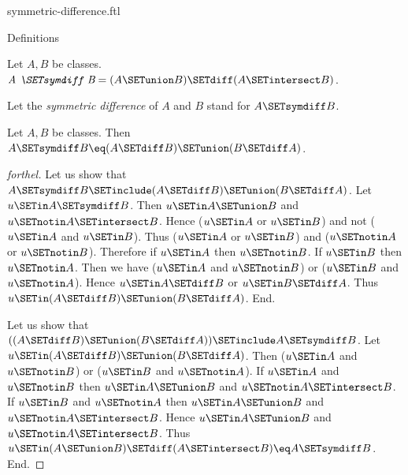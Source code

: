 \documentclass{naproche-library}
\begin{document}
\begin{smodule}[title=Symmetric Difference]{symmetric-difference.ftl}

\begin{sfragment}{Definitions}
  \begin{definition}[forthel,id=FOUNDATIONS_03_7457594151010304]
    Let $A, B$ be classes.
    $\emph{A \SETsymdiff B} = (A \SETunion B) \SETdiff (A \SETintersect B)$.

    Let the \emph{symmetric difference} of $A$ and $B$ stand for $A \SETsymdiff B$.
  \end{definition}

  \begin{proposition}[forthel,id=FOUNDATIONS_03_4886447211413504]
    Let $A, B$ be classes.
    Then $A \SETsymdiff B \eq (A \SETdiff B) \SETunion (B \SETdiff A)$.
  \end{proposition}
  \begin{proof}[forthel]
    Let us show that $A \SETsymdiff B \SETinclude (A \SETdiff B) \SETunion (B \SETdiff A)$.
      Let $u \SETin A \SETsymdiff B$.
      Then $u \SETin A \SETunion B$ and $u \SETnotin A \SETintersect B$.
      Hence ($u \SETin A$ or $u \SETin B$) and not ($u \SETin A$ and $u \SETin B$).
      Thus ($u \SETin A$ or $u \SETin B$) and ($u \SETnotin A$ or $u \SETnotin B$).
      Therefore if $u \SETin A$ then $u \SETnotin B$.
      If $u \SETin B$ then $u \SETnotin A$.
      Then we have ($u \SETin A$ and $u \SETnotin B$) or ($u \SETin B$ and $u \SETnotin A$).
      Hence $u \SETin A \SETdiff B$ or $u \SETin B \SETdiff A$.
      Thus $u \SETin (A \SETdiff B) \SETunion (B \SETdiff A)$.
    End.

    Let us show that $((A \SETdiff B) \SETunion (B \SETdiff A)) \SETinclude A \SETsymdiff B$. %
      Let $u \SETin (A \SETdiff B) \SETunion (B \SETdiff A)$.
      Then ($u \SETin A$ and $u \SETnotin B$) or ($u \SETin B$ and $u \SETnotin A$).
      If $u \SETin A$ and $u \SETnotin B$ then $u \SETin A \SETunion B$ and $u \SETnotin A \SETintersect B$.
      If $u \SETin B$ and $u \SETnotin A$ then $u \SETin A \SETunion B$ and $u \SETnotin A \SETintersect B$.
      Hence $u \SETin A \SETunion B$ and $u \SETnotin A \SETintersect B$.
      Thus $u \SETin (A \SETunion B) \SETdiff (A \SETintersect B) \eq A \SETsymdiff B$.
    End.
  \end{proof}
\end{sfragment}


\end{smodule}
\end{document}
